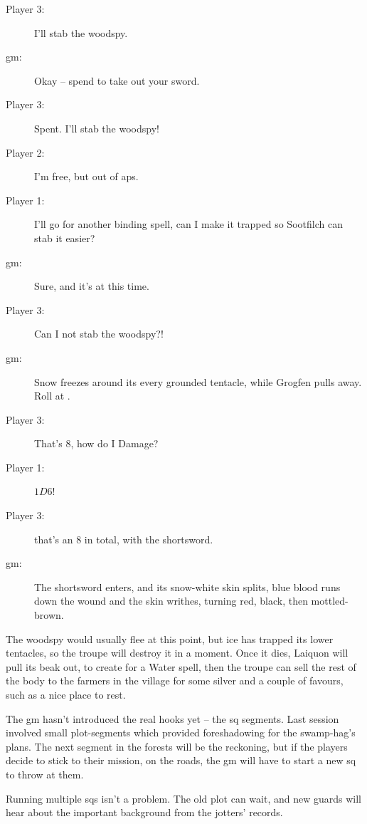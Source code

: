 \begin{multicols}{3}
\begin{description}
  \item[Player 3:]
  I'll stab the \gls{woodspy}.
  \item[\gls{gm}:]
  Okay -- spend  to take out your sword.
  \item[Player 3:]
  Spent.
  I'll stab the \gls{woodspy}!
  \item[Player 2:]
  I'm free, but out of \glspl{ap}.
  \item[Player 1:]
  I'll go for another binding spell, can I make it trapped so Sootfilch can stab it easier?
  \item[\gls{gm}:]
  Sure, and it's at \tn[10] this time.
  \item[Player 3:]
  Can I not stab the \gls{woodspy}?!
  \item[\gls{gm}:]
  Snow freezes around its every grounded tentacle, while Grogfen pulls away.
  Roll  at \tn[7].
  \item[Player 3:]
  That's 8, how do I Damage?
  \item[Player 1:]
  $1D6$!
  \item[Player 3:]
   that's an 8 in total, with the shortsword.
  \item[\gls{gm}:]
  The shortsword enters, and its snow-white skin splits, blue blood runs down the wound and the skin writhes, turning red, black, then mottled-brown.
\end{description}

\bigLine
\vspace{\baselineskip}

The \gls{woodspy} would usually flee at this point, but ice has trapped its lower tentacles, so the troupe will destroy it in a moment.
Once it dies, Laiquon will pull its beak out, to create  for a Water spell, then the troupe can sell the rest of the body to the farmers in the \gls{village} for some silver and a couple of favours, such as a nice place to rest.

The \gls{gm} hasn't introduced the real hooks yet -- the \gls{sq} \glspl{segment}.
Last session involved small plot-\glspl{segment} which provided foreshadowing for the swamp-hag's plans.
The next \gls{segment} in the forests will be the reckoning, but if the players decide to stick to their mission, on the roads, the \gls{gm} will have to start a new \gls{sq} to throw at them.

Running multiple \glspl{sq} isn't a problem.
The old plot can wait, and new \glspl{guard} will hear about the important background from the \glspl{jotter}' records.


\end{multicols}

